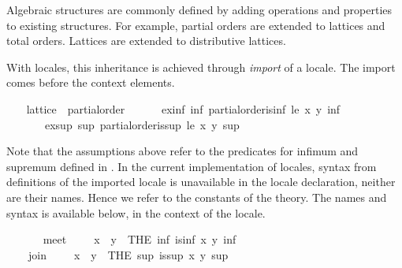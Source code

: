 \begin{isabellebody}
\begin{isamarkuptext}
  Algebraic structures are commonly defined by adding operations and
  properties to existing structures.  For example, partial orders
  are extended to lattices and total orders.  Lattices are extended to
  distributive lattices.

  With locales, this inheritance is achieved through \emph{import} of a
  locale.  The import comes before the context elements.%
\end{isamarkuptext}%
\isamarkuptrue%
\ \ \isamarkupfalse%
\ lattice\ {\isacharequal}\ partial{\isacharunderscore}order\ {\isacharplus}\isanewline
\ \ \ \ \ ex{\isacharunderscore}inf{\isacharcolon}\ {\isachardoublequoteopen}{\isasymexists}inf{\isachardot}\ partial{\isacharunderscore}order{\isachardot}is{\isacharunderscore}inf\ le\ x\ y\ inf{\isachardoublequoteclose}\isanewline
\ \ \ \ \ \ \ ex{\isacharunderscore}sup{\isacharcolon}\ {\isachardoublequoteopen}{\isasymexists}sup{\isachardot}\ partial{\isacharunderscore}order{\isachardot}is{\isacharunderscore}sup\ le\ x\ y\ sup{\isachardoublequoteclose}\isanewline
\ \ %
\begin{isamarkuptext}%
Note that the assumptions above refer to the predicates for infimum
  and supremum defined in .  In the current
  implementation of locales, syntax from definitions of the imported
  locale is unavailable in the locale declaration, neither are their
  names.  Hence we refer to the constants of the theory.  The names
  and syntax is available below, in the context of the locale.%
\end{isamarkuptext}%
\isamarkuptrue%
\ \ \isamarkupfalse%
\isanewline
\ \ \ \ meet\ {\isacharparenleft}\ {\isachardoublequoteopen}{\isasymsqinter}{\isachardoublequoteclose}\ {}{}{\isacharparenright}\ \ {\isachardoublequoteopen}x\ {\isasymsqinter}\ y\ {\isacharequal}\ {\isacharparenleft}THE\ inf{\isachardot}\ is{\isacharunderscore}inf\ x\ y\ inf{\isacharparenright}{\isachardoublequoteclose}\isanewline
\isanewline
\ \ \isamarkupfalse%
\isanewline
\ \ \ \ join\ {\isacharparenleft}\ {\isachardoublequoteopen}{\isasymsqunion}{\isachardoublequoteclose}\ {}{}{\isacharparenright}\ \ {\isachardoublequoteopen}x\ {\isasymsqunion}\ y\ {\isacharequal}\ {\isacharparenleft}THE\ sup{\isachardot}\ is{\isacharunderscore}sup\ x\ y\ sup{\isacharparenright}{\isachardoublequoteclose}\isanewline

\end{isabellebody}
